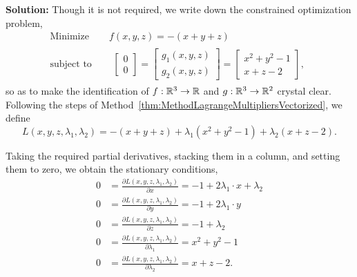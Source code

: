 \textbf{Solution:} Though it is not required, we write down the constrained optimization problem,
\begin{align*}
\text{Minimize} \quad & f(x, y, z) = -(x + y + z)\\
\text{subject to} \quad & \begin{aligned}
\left[\begin{array}{c}
0 \\
0 
\end{array}\right] = \left[\begin{array}{c}
g_1(x, y, z) \\
g_2(x, y, z) 
\end{array}\right] 
= \left[\begin{array}{c}
x^2 + y^2 -1\\
x + z - 2
\end{array}\right] ,
\end{aligned}
\end{align*}
so as to make the identification of $f:\mathbb R^3 \to \mathbb R$ and $g:\mathbb R^3 \to \mathbb R^2$ crystal clear. Following the steps of Method~\ref{thm:MethodLagrangeMultipliersVectorized}, we define
$$L(x, y, z, \lambda_1, \lambda_2) = -(x + y + z) + \lambda_1(x^2 + y^2 -1) + \lambda_2(x + z - 2). $$

Taking the required partial derivatives, stacking them in a column, and setting them to zero, we obtain the stationary conditions,
\begin{equation}
\label{eq:gradientProblemTwoConstraints}
 \begin{aligned}
   0 &= \frac{ \partial L(x, y, z, \lambda_1, \lambda_2)}{\partial x} = -1 + 2 \lambda_1 \cdot x + \lambda_2 \\
   0 &= \frac{ \partial L(x, y, z, \lambda_1, \lambda_2)}{\partial y} = -1 + 2 \lambda_1 \cdot y \\
   0 &= \frac{ \partial L(x, y, z, \lambda_1, \lambda_2)}{\partial z} = -1 + \lambda_2 \\
    0 &= \frac{ \partial L(x, y, z, \lambda_1, \lambda_2)}{\partial \lambda_1} = x^2 + y^2 - 1 \\
    0 &= \frac{ \partial L(x, y, z, \lambda_1, \lambda_2)}{\partial \lambda_2} = x + z - 2.
\end{aligned}   
\end{equation}


